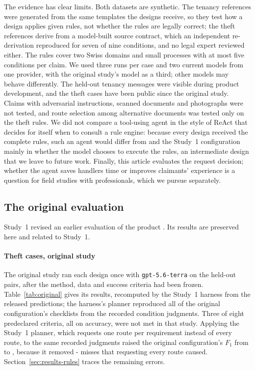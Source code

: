 The evidence has clear limits. Both datasets are synthetic. The tenancy references were generated from the same templates the designs receive, so they test how a design applies given rules, not whether the rules are legally correct; the theft references derive from a model-built source contract, which an independent re-derivation reproduced for seven of nine conditions, and no legal expert reviewed either. The rules cover two Swiss domains and small processes with at most five conditions per claim. We used three runs per case and two current models from one provider, with the original study's model as a third; other models may behave differently. The held-out tenancy messages were visible during product development, and the theft cases have been public since the original study. Claims with adversarial instructions, scanned documents and photographs were not tested, and route selection among alternative documents was tested only on the theft rules. We did not compare a tool-using agent in the style of ReAct \cite{yao2022react} that decides for itself when to consult a rule engine: because every design received the complete rules, such an agent would differ from  and the Study~1 configuration mainly in whether the model chooses to execute the rules, an intermediate design that we leave to future work. Finally, this article evaluates the request decision; whether the agent saves handlers time or improves claimants' experience is a question for field studies with professionals, which we pursue separately.

\subsection{The original evaluation}
\label{app:original}

Study~1 revised an earlier evaluation of the product \cite{casepath2026repo}. Its results are preserved here and related to Study~1.

\paragraph{Theft cases, original study}
The original study ran each design once with \texttt{gpt-5.6-terra} on the \origPairs{} held-out pairs, after the method, data and success criteria had been frozen. Table~\ref{tab:original} gives its results, recomputed by the Study~1 harness from the released predictions; the harness's planner reproduced all of the original configuration's checklists from the recorded condition judgments. Three of eight predeclared criteria, all on accuracy, were not met in that study. Applying the Study~1 planner, which requests one route per requirement instead of every route, to the same recorded judgments raised the original configuration's $F_1$ from \origCPallFone{} to \origCPoneFone, because it removed \the\numexpr\origCPallMissed-\origCPoneMissed\relax{} misses that requesting every route caused. Section~\ref{sec:results-rules} traces the remaining errors.

